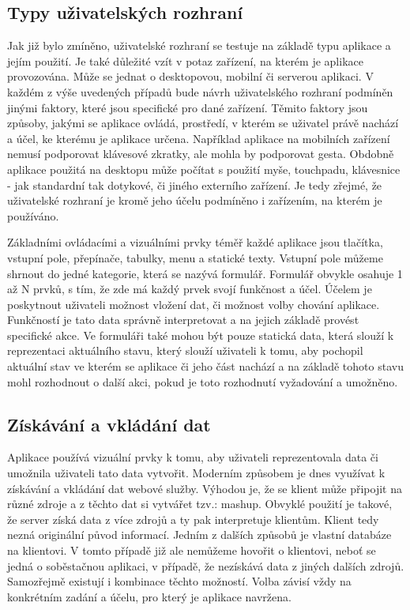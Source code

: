 \subsection{Typy uživatelských rozhraní}
Jak již bylo zmíněno, uživatelské rozhraní se testuje na základě typu aplikace a jejím použití. Je také důležité vzít v potaz zařízení, na kterém je aplikace provozována. Může se jednat o desktopovou, mobilní či serverou aplikaci. V každém z výše uvedených případů bude návrh uživatelského rozhraní podmíněn jinými faktory, které jsou specifické pro dané zařízení. Těmito faktory jsou způsoby, jakými se aplikace ovládá, prostředí, v kterém se uživatel právě nachází a účel, ke kterému je aplikace určena. Například aplikace na mobilních zařízení nemusí podporovat klávesové zkratky, ale mohla by podporovat gesta. Obdobně aplikace použitá na desktopu může počítat s použití myše, touchpadu, klávesnice - jak standardní tak dotykové, či jiného externího zařízení. Je tedy zřejmé, že uživatelské rozhraní je kromě jeho účelu podmíněno i zařízením, na kterém je používáno.

Základními ovládacími a vizuálními prvky téměř každé aplikace jsou tlačítka, vstupní pole, přepínače, tabulky, menu a statické texty. Vstupní pole můžeme shrnout do jedné kategorie, která se nazývá formulář. Formulář obvykle osahuje 1 až N prvků, s tím, že zde má každý prvek svojí funkčnost a účel. Účelem je poskytnout uživateli možnost vložení dat, či možnost volby chování aplikace. Funkčností je tato data správně interpretovat a na jejich základě provést specifické akce. Ve formuláři také mohou být pouze statická data, která slouží k reprezentaci aktuálního stavu, který slouží uživateli k tomu, aby pochopil aktuální stav ve kterém se aplikace či jeho část nachází a na základě tohoto stavu mohl rozhodnout o další akci, pokud je toto rozhodnutí vyžadování a umožněno.
\subsection{Získávání a vkládání dat}
Aplikace používá vizuální prvky k tomu, aby uživateli reprezentovala data či umožnila uživateli tato data vytvořit. Moderním způsobem je dnes využívat k získávání a vkládání dat webové služby. Výhodou je, že se klient může připojit na různé zdroje a z těchto dat si vytvářet tzv.: mashup. Obvyklé použití je takové, že server získá data z více zdrojů a ty pak interpretuje klientům. Klient tedy nezná originální původ informací. Jedním z dalších způsobů je vlastní databáze na klientovi. V tomto případě již ale nemůžeme hovořit o klientovi, neboť se jedná o soběstačnou aplikaci, v případě, že nezískává data z jiných dalších zdrojů. Samozřejmě existují i kombinace těchto možností. Volba závisí vždy na konkrétním zadání a účelu, pro který je aplikace navržena.


